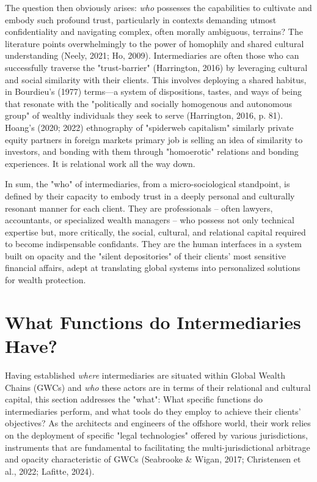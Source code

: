 The question then obviously arises: \textit{who} possesses the capabilities to cultivate and embody such profound trust, particularly in contexts demanding utmost confidentiality and navigating complex, often morally ambiguous, terrains? The literature points overwhelmingly to the power of homophily and shared cultural understanding (Neely, 2021; Ho, 2009). Intermediaries are often those who can successfully traverse the "trust-barrier" (Harrington, 2016) by leveraging cultural and social similarity with their clients. This involves deploying a shared habitus, in Bourdieu's (1977) terms—a system of dispositions, tastes, and ways of being that resonate with the "politically and socially homogenous and autonomous group" of wealthy individuals they seek to serve (Harrington, 2016, p. 81). Hoang’s (2020; 2022) ethnography of "spiderweb capitalism" similarly private equity partners in foreign markets primary job is selling an idea of similarity to investors, and bonding with them through "homoerotic" relations and bonding experiences. It is relational work all the way down.

In sum, the "who" of intermediaries, from a micro-sociological standpoint, is defined by their capacity to embody trust in a deeply personal and culturally resonant manner for each client. They are professionals – often lawyers, accountants, or specialized wealth managers – who possess not only technical expertise but, more critically, the social, cultural, and relational capital required to become indispensable confidants. They are the human interfaces in a system built on opacity and the "silent depositories" of their clients' most sensitive financial affairs, adept at translating global systems into personalized solutions for wealth protection.

\section{What Functions do Intermediaries Have?}

Having established \textit{where} intermediaries are situated within Global Wealth Chains (GWCs) and \textit{who} these actors are in terms of their relational and cultural capital, this section addresses the "what": What specific functions do intermediaries perform, and what tools do they employ to achieve their clients' objectives?  As the architects and engineers of the offshore world, their work relies on the deployment of specific "legal technologies" offered by various jurisdictions, instruments that are fundamental to facilitating the multi-jurisdictional arbitrage and opacity characteristic of GWCs (Seabrooke \& Wigan, 2017; Christensen et al., 2022; Lafitte, 2024). 

